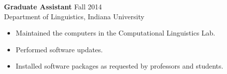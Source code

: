 \begin{singlespace}
\vspace{6pt}
\noindent\textbf{Graduate Assistant} \hfill Fall 2014 \\
Department of Linguistics, Indiana University
\begin{itemize} \itemsep2pt
\item Maintained the computers in the Computational Linguistics Lab. 
\item Performed software updates. 
\item Installed software packages as requested by professors and students.

\end{itemize}
\end{singlespace}
